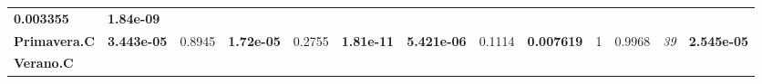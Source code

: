 \documentclass[]{book}
\theoremstyle{definition}
\theoremstyle{definition}
\theoremstyle{definition}
\theoremstyle{remark}
\begin{document}
\begin{longtable}[]{@{}lllllllllllll@{}}
\begin{minipage}[t]{0.06\columnwidth}
\textbf{0.003355}\strut
\end{minipage} & \begin{minipage}[t]{0.05\columnwidth}\raggedright
\textbf{1.84e-09}\strut
\end{minipage}\tabularnewline
\begin{minipage}[t]{0.06\columnwidth}\raggedright
\textbf{Primavera.C}\strut
\end{minipage} & \begin{minipage}[t]{0.05\columnwidth}\raggedright
\textbf{3.443e-05}\strut
\end{minipage} & \begin{minipage}[t]{0.05\columnwidth}\raggedright
0.8945\strut
\end{minipage} & \begin{minipage}[t]{0.06\columnwidth}\raggedright
\textbf{1.72e-05}\strut
\end{minipage} & \begin{minipage}[t]{0.05\columnwidth}\raggedright
0.2755\strut
\end{minipage} & \begin{minipage}[t]{0.05\columnwidth}\raggedright
\textbf{1.81e-11}\strut
\end{minipage} & \begin{minipage}[t]{0.05\columnwidth}\raggedright
\textbf{5.421e-06}\strut
\end{minipage} & \begin{minipage}[t]{0.06\columnwidth}\raggedright
0.1114\strut
\end{minipage} & \begin{minipage}[t]{0.05\columnwidth}\raggedright
\textbf{0.007619}\strut
\end{minipage} & \begin{minipage}[t]{0.05\columnwidth}\raggedright
1\strut
\end{minipage} & \begin{minipage}[t]{0.05\columnwidth}\raggedright
0.9968\strut
\end{minipage} & \begin{minipage}[t]{0.06\columnwidth}\raggedright
\emph{39}\strut
\end{minipage} & \begin{minipage}[t]{0.05\columnwidth}\raggedright
\textbf{2.545e-05}\strut
\end{minipage}\tabularnewline
\begin{minipage}[t]{0.06\columnwidth}\raggedright
\textbf{Verano.C}\strut
\end{minipage} & \begin{minipage}[t]{0.05\columnwidth}\raggedright

\end{minipage}
\end{longtable}
\end{document}
